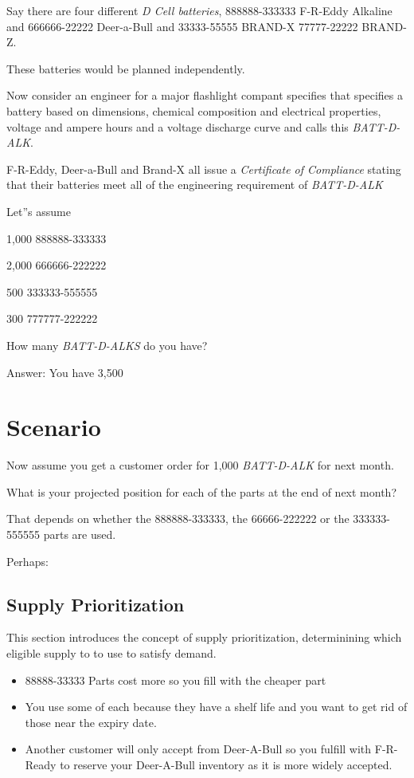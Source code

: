 \documentclass[letterpaper,10pt,english]{sphinxmanual}
\begin{document}
Say there are four different \emph{D Cell batteries}, 888888-333333 F-R-Eddy
Alkaline and 666666-22222 Deer-a-Bull and 33333-55555 BRAND-X
77777-22222 BRAND-Z.

These batteries would be planned independently.

Now consider an engineer for a major flashlight compant specifies that
specifies a battery based on dimensions, chemical composition and
electrical properties, voltage and ampere hours and a voltage discharge
curve and calls this \emph{BATT-D-ALK}.

F-R-Eddy, Deer-a-Bull and Brand-X all issue a \emph{Certificate of
Compliance} stating that their batteries meet all of the engineering
requirement of \emph{BATT-D-ALK}

Let''s assume

1,000 888888-333333

2,000 666666-222222

500 333333-555555

300 777777-222222

How many \emph{BATT-D-ALKS} do you have?

Answer: You have 3,500


\section{Scenario}
\label{BusinessProcessReengineering:scenario}
Now assume you get a customer order for 1,000 \emph{BATT-D-ALK} for next
month.

What is your projected position for each of the parts at the end of next
month?

That depends on whether the 888888-333333, the 66666-222222 or the
333333-555555 parts are used.

Perhaps:


\subsection{Supply Prioritization}
\label{BusinessProcessReengineering:supply-prioritization}
This section introduces the concept of supply prioritization,
determinining which eligible supply to to use to satisfy demand.
\begin{itemize}
\item {} 
88888-33333 Parts cost more so you fill with the cheaper part

\item {} 
You use some of each because they have a shelf life and you want to
get rid of those near the expiry date.

\item {} 
Another customer will only accept from Deer-A-Bull so you fulfill
with F-R-Ready to reserve your Deer-A-Bull inventory as it is more
widely accepted.

\end{itemize}
\end{document}
